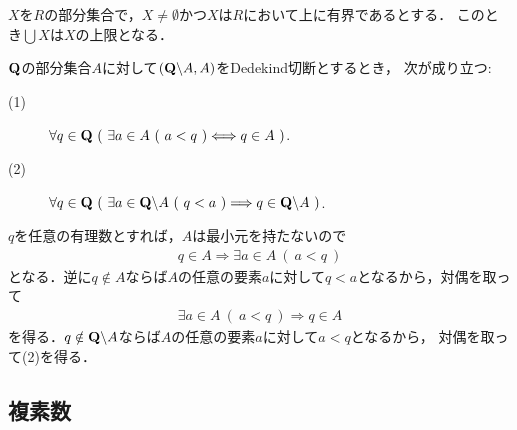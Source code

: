 	
	$X$を$R$の部分集合で，$X \neq \emptyset$かつ$X$は$R$において上に有界であるとする．
	このとき$\bigcup X$は$X$の上限となる．
	
	\begin{screen}
		\begin{thm}
			$\mathbf{Q}$の部分集合$A$に対して$(\mathbf{Q} \backslash A,A)$をDedekind切断とするとき，
			次が成り立つ:
			\begin{description}
				\item[(1)] $\forall q \in \mathbf{Q}\ (\ \exists a \in A\ (\ a < q\ )\Longleftrightarrow q \in A\ )$.
				\item[(2)] $\forall q \in \Q\ (\ \exists a \in \Q \backslash A\ (\ q < a\ )\Longrightarrow q \in \Q \backslash A\ )$.
			\end{description}
		\end{thm}
	\end{screen}
	
	\begin{prf}
		$q$を任意の有理数とすれば，$A$は最小元を持たないので
		\begin{align}
			q \in A \Longrightarrow \exists a \in A\ (\ a < q\ )
		\end{align}
		となる．逆に$q \notin A$ならば$A$の任意の要素$a$に対して$q < a$となるから，対偶を取って
		\begin{align}
			\exists a \in A\ (\ a < q\ ) \Longrightarrow q \in A
		\end{align}
		を得る．$q \notin \mathbf{Q} \backslash A$ならば$A$の任意の要素$a$に対して$a < q$となるから，
		対偶を取って(2)を得る．
		\QED
	\end{prf}

\subsection{複素数}